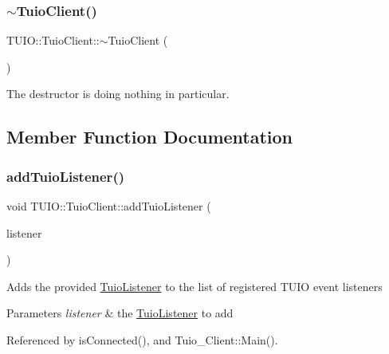 \subsubsection{\texorpdfstring{$\sim$\+Tuio\+Client()}{~TuioClient()}}
{\footnotesize\ttfamily T\+U\+I\+O\+::\+Tuio\+Client\+::$\sim$\+Tuio\+Client (\begin{DoxyParamCaption}{ }\end{DoxyParamCaption})}

The destructor is doing nothing in particular. 

\subsection{Member Function Documentation}
\mbox{\label{class_t_u_i_o_1_1_tuio_client_a5edd6293d13a5e4cc31f734ede575241}} 
\subsubsection{\texorpdfstring{add\+Tuio\+Listener()}{addTuioListener()}}
{\footnotesize\ttfamily void T\+U\+I\+O\+::\+Tuio\+Client\+::add\+Tuio\+Listener (\begin{DoxyParamCaption}\item[{\hyperlink{class_t_u_i_o_1_1_tuio_listener}{Tuio\+Listener} $\ast$}]{listener }\end{DoxyParamCaption})}

Adds the provided \hyperlink{class_t_u_i_o_1_1_tuio_listener}{Tuio\+Listener} to the list of registered T\+U\+IO event listeners


\begin{DoxyParams}{Parameters}
{\em listener} & the \hyperlink{class_t_u_i_o_1_1_tuio_listener}{Tuio\+Listener} to add \\
\hline
\end{DoxyParams}


Referenced by is\+Connected(), and Tuio\+\_\+\+Client\+::\+Main().

\mbox{\label{class_t_u_i_o_1_1_tuio_client_affe2a075119d66e3047e29a5438c6af5}} 
